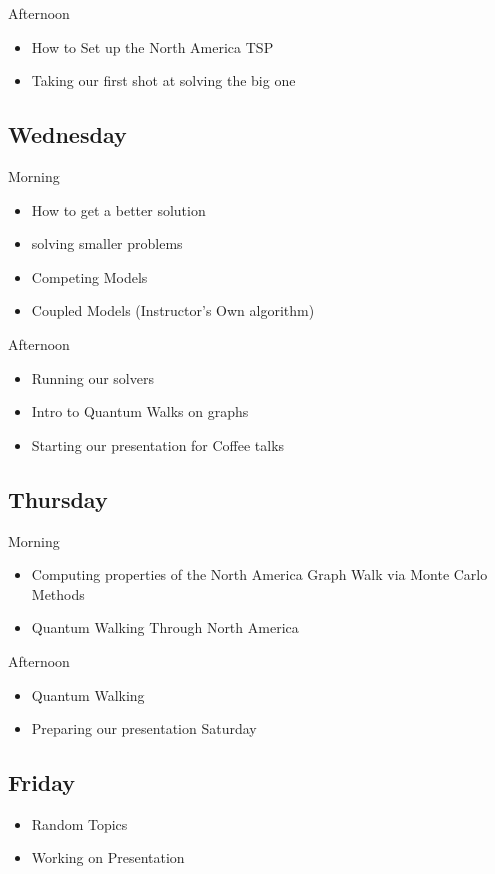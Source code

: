 \documentclass{article}
\theoremstyle{definition}
\theoremstyle{remark}
\begin{document}
Afternoon
\begin{itemize}
	\item How to Set up the North America TSP
	\item Taking our first shot at solving the big one
\end{itemize}

\subsection{Wednesday}
Morning
\begin{itemize}
	\item How to get a better solution
	\item solving smaller problems
	\item Competing Models
	\item Coupled Models (Instructor's Own algorithm)
\end{itemize}
Afternoon
\begin{itemize}
	\item Running our solvers
	\item Intro to Quantum Walks on graphs
	\item Starting our presentation for Coffee talks
\end{itemize}

\subsection{Thursday}
Morning
\begin{itemize}
	\item Computing properties of the North America Graph Walk via Monte Carlo Methods
	\item Quantum Walking Through North America
\end{itemize}
Afternoon
\begin{itemize}
	\item Quantum Walking 
	\item Preparing our presentation Saturday
\end{itemize}

\subsection{Friday}
\begin{itemize}
	\item Random Topics
	\item Working on Presentation
\end{itemize}
\end{document}
